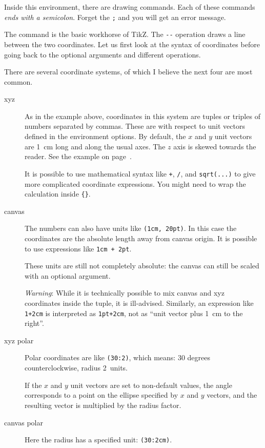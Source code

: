 Inside this environment, there are drawing commands.
Each of these commands \emph{ends with a semicolon}.
Forget the \verb|;| and you will get an error message.

The  command is the basic workhorse of TikZ.
The \verb|--| operation draws a line between the two coordinates.
Let us first look at the syntax of coordinates before going back to the optional arguments
and different operations.

There are several coordinate systems, of which I believe the next four are most common.
\begin{description}
\item[xyz] As in the example above, coordinates in this system are
    tuples or triples of numbers separated by commas.
    These are with respect to unit vectors defined in the environment options.
    By default, the $x$ and $y$ unit vectors are 1~cm long and along the usual axes.
    The $z$ axis is skewed towards the reader.
    See the example on page~\pageref{ex:tikz basis}.

    It is possible to use mathematical syntax like \verb|+|, \verb|/|, and \verb|sqrt(...)|
    to give more complicated coordinate expressions.
    You might need to wrap the calculation inside \verb|{}|.

\item[canvas] The numbers can also have units like \verb|(1cm, 20pt)|.
    In this case the coordinates are the absolute length away from canvas origin.
    It is possible to use expressions like \verb|1cm + 2pt|.
    
    These units are still not completely absolute:
    the canvas can still be scaled with an optional argument.

    \emph{Warning}: While it is technically possible to mix canvas and xyz coordinates
    inside the tuple, it is ill-advised.
    Similarly, an expression like \verb|1+2cm| is interpreted as \verb|1pt+2cm|,
    not as ``unit vector plus 1~cm to the right''.

\item[xyz polar] Polar coordinates are like \verb|(30:2)|,
    which means: 30 degrees counterclockwise, radius 2~units.

    If the $x$ and $y$ unit vectors are set to non-default values,
    the angle corresponds to a point on the ellipse specified by $x$ and $y$ vectors,
    and the resulting vector is multiplied by the radius factor.

\item[canvas polar] Here the radius has a specified unit: \verb|(30:2cm)|.
\end{description}

